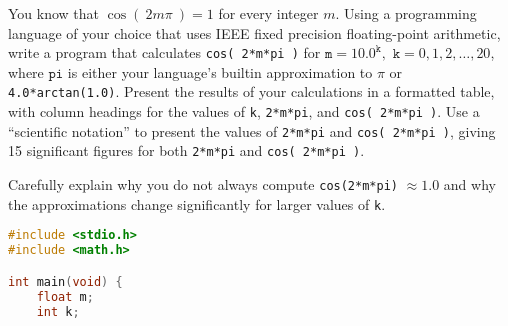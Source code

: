 \documentclass{exam}
\begin{document}
\begin{questions}
\question
You know that $\cos(~2m\pi~) = 1$ for every integer $m.$
Using a programming language of your choice that uses
IEEE fixed precision floating-point arithmetic,
write a program that calculates
{\tt cos(~2*m*pi~)} for $\mathtt{m} = 10.0^\mathtt{k},$ 
$\mathtt{k}=0,1,2,\ldots,20$,
where $\mathtt{pi}$ is either your language's builtin approximation to $\pi$
or {\tt 4.0*arctan(1.0)}.
Present the results of your calculations in a formatted table,
with column headings for the values of {\tt k}, 
{\tt 2*m*pi},
and {\tt cos(~2*m*pi~)}.
Use a ``scientific notation''
to present the values of {\tt 2*m*pi} and
{\tt cos(~2*m*pi~)},
giving 15 significant figures for both {\tt 2*m*pi}
and {\tt cos(~2*m*pi~)}.

Carefully explain why you do not always compute 
{\tt cos(2*m*pi)} $\approx 1.0$
and why the approximations change significantly for larger
values of {\tt k}.
\begin{lstlisting}[language=c, frame=single, breaklines=true, label=amb, caption=Code]
#include <stdio.h>
#include <math.h>

int main(void) {
	float m;
	int k;


\end{lstlisting}
\end{questions}
\end{document}
